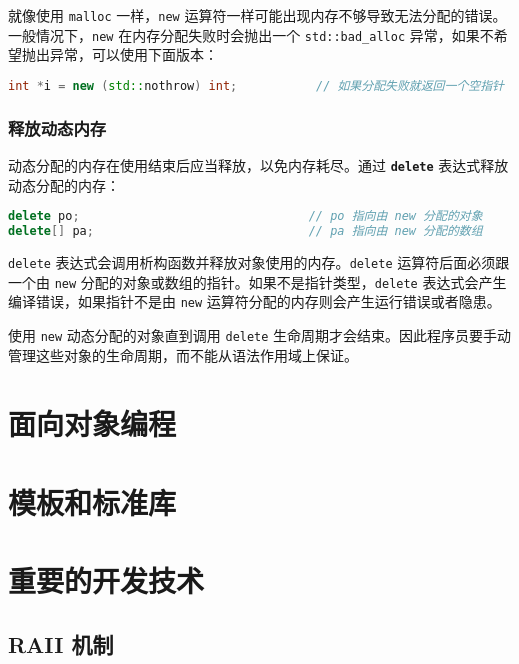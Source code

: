 \documentclass[hyperref,UTF8]{article}
\begin{document}
就像使用 \texttt{malloc} 一样，\texttt{new} 运算符一样可能出现内存不够导致无法分配的错误。一般情况下，\texttt{new} 在内存分配失败时会抛出一个 \texttt{std::bad\_alloc} 异常，如果不希望抛出异常，可以使用下面版本：
\begin{lstlisting}[language=c++,numbers=none]
int *i = new (std::nothrow) int;           // 如果分配失败就返回一个空指针
\end{lstlisting}

\subsubsection{释放动态内存}

动态分配的内存在使用结束后应当释放，以免内存耗尽。通过 \textbf{\texttt{delete}} 表达式释放动态分配的内存：
\begin{lstlisting}[language=c++,numbers=none]
delete po;                                // po 指向由 new 分配的对象
delete[] pa;                              // pa 指向由 new 分配的数组
\end{lstlisting}
\texttt{delete} 表达式会调用析构函数并释放对象使用的内存。\texttt{delete} 运算符后面必须跟一个由 \texttt{new} 分配的对象或数组的指针。如果不是指针类型，\texttt{delete} 表达式会产生编译错误，如果指针不是由 \texttt{new} 运算符分配的内存则会产生运行错误或者隐患。

使用 \texttt{new} 动态分配的对象直到调用 \texttt{delete} 生命周期才会结束。因此程序员要手动管理这些对象的生命周期，而不能从语法作用域上保证。

\section{面向对象编程}

\section{模板和标准库}

\section{重要的开发技术}

\subsection{RAII 机制}
\end{document}
